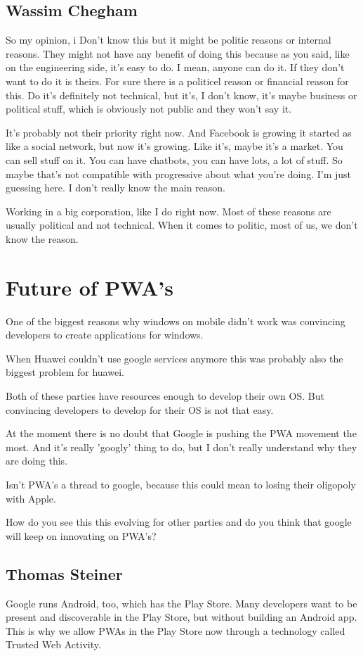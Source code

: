 		\subsection{Wassim Chegham}
			So my opinion, i Don't know this but it might be politic reasons or internal reasons. They might not have any benefit of doing this because as you said, like on the engineering side, it's easy to do. I mean, anyone can do it. If they don't want to do it is theirs. For sure there is a politicel reason or financial reason for this. Do it's definitely not technical, but it's, I don't know, it's maybe business or political stuff, which is obviously not public and they won't say it. 
			
			
			It's probably not their priority right now. And Facebook is growing it started as like a social network, but now it's growing. Like it's, maybe it's a market. You can sell stuff on it. You can have chatbots, you can have lots, a lot of stuff. So maybe that's not compatible with progressive about what you're doing. I'm just guessing here. I don't really know the main reason. 
			
			Working in a big corporation, like I do right now. Most of these reasons are usually political and not technical. When it comes to politic, most of us, we don't know the reason.
		
	
	\section{Future of PWA's }
		One of the biggest reasons why windows on mobile didn't work was convincing developers to create applications for windows. 
		
		When Huawei couldn't use google services anymore this was probably also the biggest problem for huawei.
		
		Both of these parties have resources enough to develop their own OS. But convincing developers to develop for their OS is not that easy.
		
		At the moment there is no doubt that Google is pushing the PWA movement the most. And it's really 'googly' thing to do, but I don't really understand why they are doing this.
		
		Isn't PWA's a thread to google, because this could mean to losing their oligopoly with Apple.
		
		How do you see this this evolving for other parties and do you think that google will keep on innovating on PWA's?
		
		\subsection{Thomas Steiner}
			Google runs Android, too, which has the Play Store. Many developers want to be present and discoverable in the Play Store, but without building an Android app. This is why we allow PWAs in the Play Store now through a technology called Trusted Web Activity. 
			
